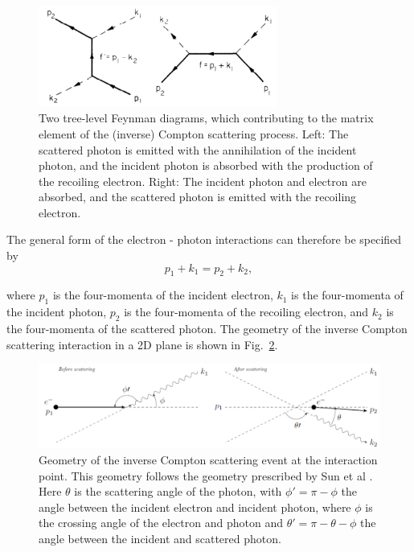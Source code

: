 \documentclass[../main.tex]{subfiles}
\begin{document}
\begin{figure}[!htb]
    \centering\includegraphics[width=0.7\textwidth]{Figures/Theory_of_Photon_Production_by_Inverse_Compton_Scattering/Berestetskii_ICS_Feynman.pdf}
    \caption{Two tree-level Feynman diagrams, which contributing to the matrix element of the (inverse) Compton scattering process. Left: The scattered photon is emitted with the annihilation of the incident photon, and the incident photon is absorbed with the production of the recoiling electron. Right: The incident photon and electron are absorbed, and the scattered photon is emitted with the recoiling electron. \cite{berestetskii1982quantum}}
    \label{fig:ICS_Feynman_diagrams}
\end{figure}

The general form of the electron - photon interactions can therefore be specified by
\begin{equation}
p_{1} + k_{1} = p_{2} + k_{2},
\label{eq:ICS_process}
\end{equation}

where $p_{1}$ is the four-momenta of the incident electron, $k_{1}$ is the four-momenta of the incident photon, $p_{2}$ is the four-momenta of the recoiling electron, and $k_{2}$ is the four-momenta of the scattered photon. The geometry of the inverse Compton scattering interaction in a 2D plane is shown in Fig.~\ref{fig:scattered_photon_kinematics}.

\begin{figure}[!htb]
    \centering
    \includegraphics[width=\textwidth]{Figures/Theory_of_Photon_Production_by_Inverse_Compton_Scattering/scatteringkinematicsdiagram.pdf}
    \caption{Geometry of the inverse Compton scattering event at the interaction point. This geometry follows the geometry prescribed by Sun et al \cite{sun2009energy}. Here $\theta$ is the scattering angle of the photon, with $\phi' = \pi -\phi$ the angle between the incident electron and incident photon, where $\phi$ is the crossing angle of the electron and photon and $\theta' = \pi - \theta - \phi$ the angle between the incident and scattered photon. }
    \label{fig:scattered_photon_kinematics}
\end{figure}
\end{document}
